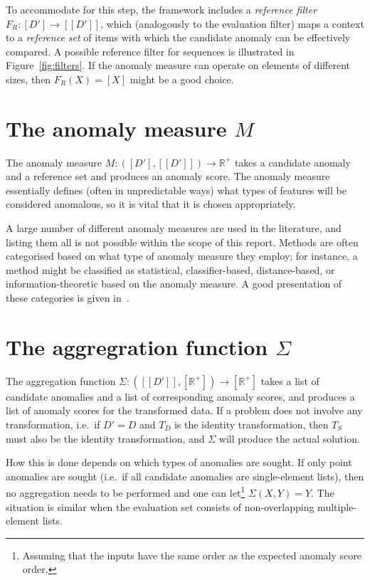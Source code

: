 To accommodate for this step, the framework includes a \emph{reference filter} $F_R: [D'] \rightarrow [[D']] $, which (analogously to the evaluation filter) maps a context to a \emph{reference set} of items with which the candidate anomaly can be effectively compared. A possible reference filter for sequences is illustrated in Figure~\ref{fig:filters}. If the anomaly measure can operate on elements of different sizes, then $F_R(X) = [X]$ might be a good choice.

\section{The anomaly measure $M$}
\label{sect:anomaly_measure}

The anomaly measure $M: ([D'], [[D']]) \rightarrow \mathbb{R}^+$ takes a candidate anomaly and a reference set and produces an anomaly score. The anomaly measure essentially defines (often in unpredictable ways) what types of features will be considered anomalous, so it is vital that it is chosen appropriately.

A large number of different anomaly measures are used in the literature, and listing them all is not possible within the scope of this report. Methods are often categorised based on what type of anomaly measure they employ; for instance, a method might be classified as statistical, classifier-based, distance-based, or information-theoretic based on the anomaly measure. A good presentation of these categories is given in~\cite{chandola}.

\section{The aggregration function $\Sigma$}
\label{sect:aggregation_function}

The aggregation function $\Sigma: ([[D']], [\mathbb{R}^+]) \rightarrow [\mathbb{R}^+]$ takes a list of candidate anomalies and a list of corresponding anomaly scores, and produces a list of anomaly scores for the transformed data. If a problem does not involve any transformation, i.e.\ if  $D' = D$ and $T_D$ is the identity transformation, then $T_S$ must also be the identity transformation, and $\Sigma$ will produce the actual solution.

How this is done depends on which types of anomalies are sought. If only point anomalies are sought (i.e.\ if all candidate anomalies are single-element lists), then no aggregation needs to be performed and one can let\footnote{Assuming that the inputs have the same order as the expected anomaly score order.} $\Sigma(X, Y) = Y$. The situation is similar when the evaluation set consists of non-overlapping multiple-element lists.


